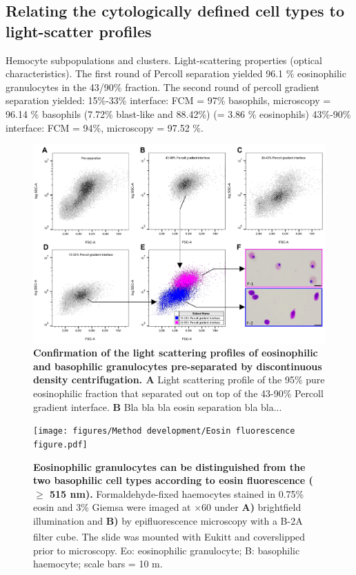 \subsection{Relating the cytologically defined cell types to light-scatter profiles}
Hemocyte subpopulations and clusters. Light-scattering properties (optical characteristics).
The first round of Percoll separation yielded 96.1 \% eosinophilic granulocytes in the 43/90\% fraction.
The second round of percoll gradient separation yielded: 15\%-33\% interface: FCM = 97\% basophils, microscopy = 96.14 \% basophils (7.72\% blast-like and 88.42\%) (= 3.86 \% eosinophils) 43\%-90\% interface: FCM = 94\%, microscopy = 97.52 \%.

\begin{figure}[!ht]
    \centering
    \includegraphics[width=1.0\textwidth]{figures/Method development/PERCOLL SEP II final.pdf}
    \caption{\textbf{Confirmation of the light scattering profiles of eosinophilic and basophilic granulocytes pre-separated by discontinuous density centrifugation. A} Light scattering profile of the 95\% pure eosinophilic fraction that separated out on top of the 43-90\% Percoll gradient interface. \textbf{B} Bla bla bla eosin separation bla bla...}
    \label{fig:Percoll-dotplots}
\end{figure}



\begin{figure}[!ht]
    \centering
    \texttt{[image: figures/Method development/Eosin fluorescence figure.pdf]}
    \caption{\textbf{Eosinophilic granulocytes can be distinguished from the two basophilic cell types according to eosin fluorescence ($\geq$ 515 nm).} Formaldehyde-fixed haemocytes stained in 0.75\% eosin and 3\% Giemsa were imaged at $\times$60 under \textbf{A)} brightfield illumination and \textbf{B)} by epifluorescence microscopy with a B-2A filter cube. The slide was mounted with Eukitt\textsuperscript{\textregistered} and coverslipped prior to microscopy. Eo: eosinophilic granulocyte; B: basophilic haemocyte; scale bars = 10 \micro m. }
    \label{fig:eosin_fluorescence_B2A}
\end{figure}



